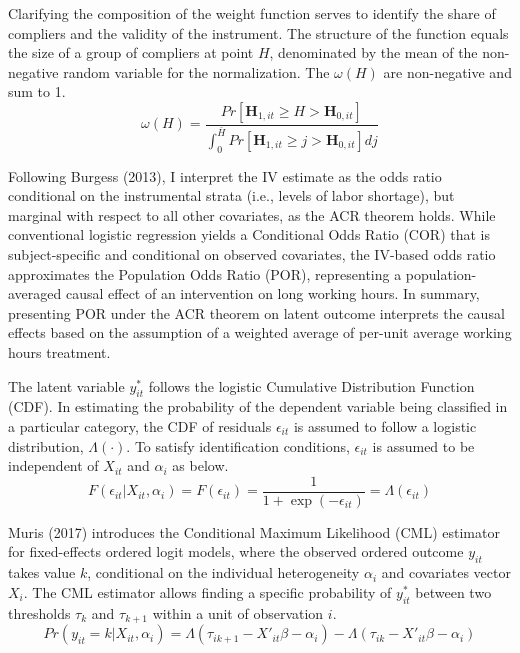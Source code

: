 \documentclass[
  12pt,
]{article}
\begin{document}
Clarifying the composition of the weight function serves to identify the
share of compliers and the validity of the instrument. The structure of
the function equals the size of a group of compliers at point \(H\),
denominated by the mean of the non-negative random variable for the
normalization. The \(\omega(H)\) are non-negative and sum to 1. \[
\omega(H)=\frac{Pr[\mathbf{H}_{1,it} \geq H >\mathbf{H}_{0,it}]}{\int_{0}^{\bar{H}}Pr[\mathbf{H}_{1,it} \geq j >\mathbf{H}_{0,it}]dj}
\]

Following Burgess (2013), I interpret the IV estimate as the odds ratio
conditional on the instrumental strata (i.e., levels of labor shortage),
but marginal with respect to all other covariates, as the ACR theorem
holds. While conventional logistic regression yields a Conditional Odds
Ratio (COR) that is subject-specific and conditional on observed
covariates, the IV-based odds ratio approximates the Population Odds
Ratio (POR), representing a population-averaged causal effect of an
intervention on long working hours. In summary, presenting POR under the
ACR theorem on latent outcome interprets the causal effects based on the
assumption of a weighted average of per-unit average working hours
treatment.

The latent variable \(y^*_{it}\) follows the logistic Cumulative
Distribution Function (CDF). In estimating the probability of the
dependent variable being classified in a particular category, the CDF of
residuals \(\epsilon_{it}\) is assumed to follow a logistic
distribution, \(\Lambda(\cdot)\). To satisfy identification conditions,
\(\epsilon_{it}\) is assumed to be independent of \(X_{it}\) and
\(\alpha_i\) as below. \[
F(\epsilon_{it}| X_{it}, \alpha_i) = F(\epsilon_{it}) =\frac{1}{1 + \exp(-\epsilon_{it})} =\Lambda(\epsilon_{it})
\]

Muris (2017) introduces the Conditional Maximum Likelihood (CML)
estimator for fixed-effects ordered logit models, where the observed
ordered outcome \(y_{it}\) takes value \(k\), conditional on the
individual heterogeneity \(\alpha_i\) and covariates vector \(X_i\). The
CML estimator allows finding a specific probability of \(y^*_{it}\)
between two thresholds \(\tau_k\) and \(\tau_{k+1}\) within a unit of
observation \(i\). \[
Pr\left(y_{it}=k|X_{it},\alpha_i \right)=\Lambda(\tau_{ik+1}-X'_{it}\beta-\alpha_i)-\Lambda(\tau_{ik}-X'_{it}\beta-\alpha_i)
\]
\end{document}
